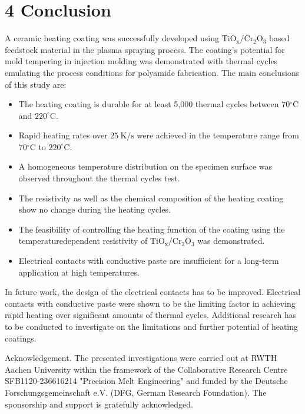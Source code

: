 \documentclass[10pt]{article}
\begin{document}
\section*{4 Conclusion}
A ceramic heating coating was successfully developed using $\mathrm{TiO}_{\mathrm{x}} / \mathrm{Cr}_{2} \mathrm{O}_{3}$ based feedstock material in the plasma spraying process. The coating's potential for mold tempering in injection molding was demonstrated with thermal cycles emulating the process conditions for polyamide fabrication. The main conclusions of this study are:

\begin{itemize}
  \item The heating coating is durable for at least 5,000 thermal cycles between $70{ }^{\circ} \mathrm{C}$ and $220^{\circ} \mathrm{C}$.

  \item Rapid heating rates over $25 \mathrm{~K} / \mathrm{s}$ were achieved in the temperature range from $70{ }^{\circ} \mathrm{C}$ to $220^{\circ} \mathrm{C}$.

  \item A homogeneous temperature distribution on the specimen surface was observed throughout the thermal cycles test.

  \item The resistivity as well as the chemical composition of the heating coating show no change during the heating cycles.

  \item The feasibility of controlling the heating function of the coating using the temperaturedependent resistivity of $\mathrm{TiO}_{\mathrm{x}} / \mathrm{Cr}_{2} \mathrm{O}_{3}$ was demonstrated.

  \item Electrical contacts with conductive paste are insufficient for a long-term application at high temperatures.

\end{itemize}

In future work, the design of the electrical contacts has to be improved. Electrical contacts with conductive paste were shown to be the limiting factor in achieving rapid heating over significant amounts of thermal cycles. Additional research has to be conducted to investigate on the limitations and further potential of heating coatings.

Acknowledgement. The presented investigations were carried out at RWTH Aachen University within the framework of the Collaborative Research Centre SFB1120-236616214 "Precision Melt Engineering" and funded by the Deutsche Forschungsgemeinschaft e.V. (DFG, German Research Foundation). The sponsorship and support is gratefully acknowledged.
\end{document}
